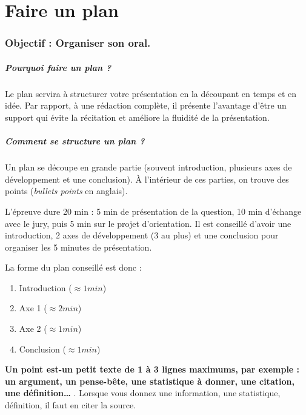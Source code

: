 \setcounter{section}{0}

\chapter*{Faire un plan}
\subsection*{\centering Objectif : Organiser son oral.}

\paragraph{Pourquoi faire un plan ? }
Le plan servira à structurer votre présentation en la découpant en temps et en idée.
Par rapport, à une rédaction complète, il présente l'avantage d'être un support qui évite la récitation et améliore la fluidité de la présentation.

\paragraph{Comment se structure un plan ? }
Un plan se découpe en grande partie (souvent introduction, plusieurs axes de développement et une conclusion).
À l'intérieur de ces parties, on trouve des points (\textit{bullets points} en anglais).

L'épreuve dure 20 min : 5 min de présentation de la question, 10 min d'échange avec le jury, puis 5 min sur le projet d'orientation.
Il est conseillé d'avoir une introduction, 2 axes de développement (3 au plus) et une conclusion pour organiser les 5 minutes de présentation.

\begin{center}
    La forme du plan conseillé est donc :
    \begin{enumerate}
        \item Introduction ($\approx 1min$)
        \item Axe 1 ($\approx 2min$)
        \item Axe 2 ($\approx 1min$)
        \item Conclusion ($\approx 1min$)
    \end{enumerate}    
\end{center}

\textbf{Un point est-un petit texte de 1 à 3 lignes maximums, par exemple : un argument, un pense-bête, une statistique à donner, une citation, une définition…
}.
Lorsque vous donnez une information, une statistique, définition, il faut en citer la source. 


